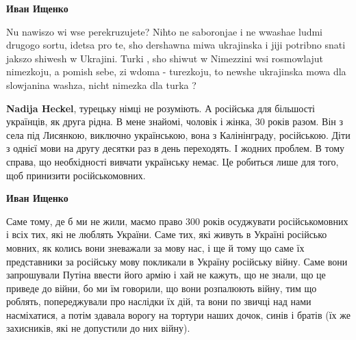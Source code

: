 \begin{itemize}
\begin{itemize}
\begin{itemize}
 
\textbf{Иван Ищенко} 

Nu nawiszo wi wse perekruzujete? Nihto ne saboronjae i ne wwashae ludmi drugogo
sortu, idetsa pro te, sho dershawna miwa ukrajinska i jiji potribno snati
jakszo shiwesh w Ukrajini. Turki , sho shiwut w Nimezzini wsi rosmowlajut
nimezkoju, a pomish sebe, zi wdoma - turezkoju, to newshe ukrajinska mowa dla
slowjanina washza, nicht nimezka dla turka ?


 
\textbf{Nadija Heckel}, турецьку німці не розуміють. А російська для більшості
українців, як друга рідна. В мене знайомі, чоловік і жінка, 30 років разом. Він з
села під Лисянкою, виключно українською, вона з Калінінграду, російською. Діти з
однієї мови на другу десятки раз в день переходять. І жодних проблем. В тому
справа, що необхідності вивчати українську немає. Це робиться лише для того, щоб
принизити російськомовних.


 
\textbf{Иван Ищенко} 

Саме тому, де б ми не жили, маємо право 300 років осуджувати російськомовних і
всіх тих, які не люблять України. Саме тих, які живуть в Україні російсько
мовних, як колись вони зневажали за мову нас, і ще й тому що саме їх
представники за російську мову покликали в Україну російську війну. Саме вони
запрошували Путіна ввести його армію і хай не кажуть, що не знали, що це
приведе до війни, бо ми їм говорили, що вони розпалюють війну, тим що роблять,
попереджували про наслідки їх дій, та вони по звичці над нами насміхатися, а
потім здавала ворогу на тортури наших дочок, синів і братів (їх же захисників,
які не допустили до них війну). 


\end{itemize}
\end{itemize}
\end{itemize}
